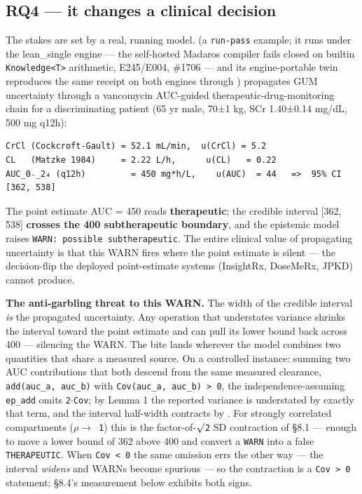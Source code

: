 \documentclass[sigplan,review,anonymous,10pt]{acmart}
\begin{document}
\subsection{RQ4 --- it changes a clinical decision}

The stakes are set by a real, running model.  (a \texttt{run-pass} example; it runs under the lean\_single engine --- the self-hosted Madaros compiler fails closed on builtin \texttt{Knowledge<T>} arithmetic, E245/E004, \#1706 --- and its engine-portable twin  reproduces the same receipt on both engines through ) propagates GUM uncertainty through a vancomycin AUC-guided therapeutic-drug-monitoring chain for a discriminating patient (65 yr male, 70±1 kg, SCr 1.40±0.14 mg/dL, 500 mg q12h):

\begin{lstlisting}
CrCl (Cockcroft-Gault) = 52.1 mL/min,  u(CrCl) = 5.2
CL   (Matzke 1984)     = 2.22 L/h,      u(CL)   = 0.22
AUC_0₋_2₄ (q12h)         = 450 mg*h/L,    u(AUC)  = 44   =>  95% CI [362, 538]
\end{lstlisting}

The point estimate AUC = 450 reads \textbf{therapeutic}; the credible interval [362, 538] \textbf{crosses the 400 subtherapeutic boundary}, and the epistemic model raises \texttt{WARN: possible subtherapeutic}. The entire clinical value of propagating uncertainty is that this WARN fires where the point estimate is silent --- the decision-flip the deployed point-estimate systems (InsightRx, DoseMeRx, JPKD) cannot produce.

\textbf{The anti-garbling threat to this WARN.} The width of the credible interval \emph{is} the propagated uncertainty. Any operation that understates variance shrinks the interval toward the point estimate and can pull its lower bound back across 400 --- silencing the WARN. The bite lands wherever the model combines two quantities that share a measured source. On a controlled instance: summing two AUC contributions that both descend from the same measured clearance, \texttt{add(auc\_a, auc\_b)} with \texttt{Cov(auc\_a, auc\_b) > 0}, the independence-assuming \texttt{ep\_add} omits \texttt{2$\cdot$Cov}; by Lemma 1 the reported variance is understated by exactly that term, and the interval half-width contracts by . For strongly correlated compartments (\texttt{$\rho\rightarrow$ 1}) this is the factor-of-\texttt{$\surd$2} SD contraction of §8.1 --- enough to move a lower bound of 362 above 400 and convert a \texttt{WARN} into a false \texttt{THERAPEUTIC}. When \texttt{Cov < 0} the same omission errs the other way --- the interval \emph{widens} and WARNs become spurious --- so the contraction is a \texttt{Cov > 0} statement; §8.4's measurement below exhibits both signs.
\end{document}
